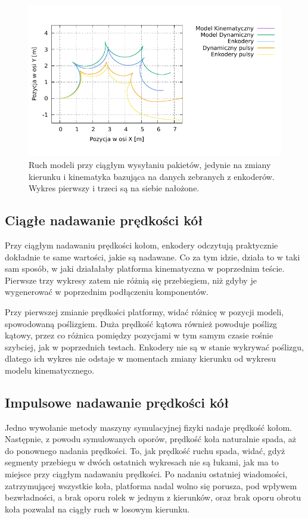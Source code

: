 	\begin{figure}[H]
		\centering
		\includegraphics[width=\textwidth]{plots/star_encoders.pdf}
			\caption{Ruch modeli przy ciągłym wysyłaniu pakietów, jedynie na zmiany kierunku i kinematyka bazująca na danych zebranych z enkoderów. Wykres pierwszy i trzeci są na siebie nałożone.}
		\label{plot:star_encoders}
	\end{figure}
	
	\subsection{Ciągłe nadawanie prędkości kół}
		Przy ciągłym nadawaniu prędkości kołom, enkodery odczytują praktycznie dokładnie te same wartości, jakie są nadawane.
		Co za tym idzie, działa to w taki sam sposób, w jaki działałaby platforma kinematyczna w poprzednim teście.
		Pierwsze trzy wykresy zatem nie różnią się przebiegiem, niż gdyby je wygenerować w poprzednim podłączeniu komponentów.
		
		Przy pierwszej zmianie prędkości platformy, widać różnicę w pozycji modeli, spowodowaną poślizgiem.
		Duża prędkość kątowa również powoduje poślizg kątowy, przez co różnica pomiędzy pozycjami w tym samym czasie rośnie szybciej, jak w poprzednich testach.
		Enkodery nie są w stanie wykrywać poślizgu, dlatego ich wykres nie odstaje w momentach zmiany kierunku od wykresu modelu kinematycznego.
		
	\subsection{Impulsowe nadawanie prędkości kół}
		Jedno wywołanie metody maszyny symulacyjnej fizyki nadaje prędkość kołom. Następnie, z powodu symulowanych oporów, prędkość koła naturalnie spada, aż do
		ponownego nadania prędkości. To, jak prędkość ruchu spada, widać, gdyż segmenty przebiegu w dwóch ostatnich wykresach nie są łukami, jak ma to miejsce przy 
		ciągłym nadawaniu prędkości. Po nadaniu ostatniej wiadomości, zatrzymującej wszystkie koła, platforma nadal wolno się porusza, pod wpływem bezwładności, a brak oporu rolek w jednym z kierunków, oraz brak oporu obrotu koła pozwalał na ciągły ruch w losowym kierunku.
		
